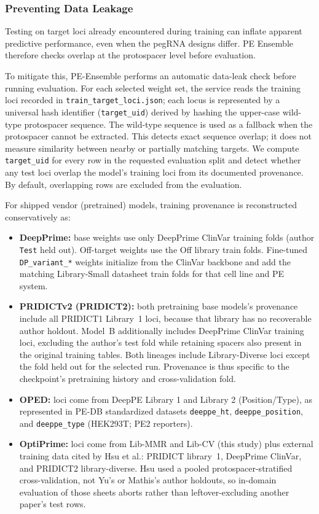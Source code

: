\documentclass{article}
\begin{document}
\subsubsection{Preventing Data Leakage}

Testing on target loci already encountered during training can inflate apparent predictive performance, even when the pegRNA designs differ. PE Ensemble therefore checks overlap at the protospacer level before evaluation.

To mitigate this, PE-Ensemble performs an automatic data-leak check before running evaluation. For each selected weight set, the service reads the training loci recorded in \nolinkurl{train_target_loci.json}; each locus is represented by a universal hash identifier (\texttt{target\_uid}) derived by hashing the upper-case wild-type protospacer sequence. The wild-type sequence is used as a fallback when the protospacer cannot be extracted. This detects exact sequence overlap; it does not measure similarity between nearby or partially matching targets. We compute \texttt{target\_uid} for every row in the requested evaluation split and detect whether any test loci overlap the model's training loci from its documented provenance. By default, overlapping rows are excluded from the evaluation.

For shipped vendor (pretrained) models, training provenance is reconstructed conservatively as:
\begin{itemize}
    \item \textbf{DeepPrime:} base weights use only DeepPrime ClinVar training folds (author \texttt{Test} held out). Off-target weights use the Off library train folds. Fine-tuned \texttt{DP\_variant\_*} weights initialize from the ClinVar backbone and add the matching Library-Small datasheet train folds for that cell line and PE system.
    \item \textbf{PRIDICTv2 (PRIDICT2):} both pretraining base models's provenance include all PRIDICT1 Library~1 loci, because that library has no recoverable author holdout. Model~B additionally includes DeepPrime ClinVar training loci, excluding the author's test fold while retaining spacers also present in the original training tables. Both lineages include Library-Diverse loci except the fold held out for the selected run. Provenance is thus specific to the checkpoint's pretraining history and cross-validation fold.
    \item \textbf{OPED:} loci come from DeepPE Library 1 and Library 2 (Position/Type), as represented in PE-DB standardized datasets \nolinkurl{deeppe\_ht}, \nolinkurl{deeppe\_position}, and \nolinkurl{deeppe\_type} (HEK293T; PE2 reporters).
    \item \textbf{OptiPrime:} loci come from Lib-MMR and Lib-CV (this study) plus external training data cited by Hsu et al.: PRIDICT library~1, DeepPrime ClinVar, and PRIDICT2 library-diverse. Hsu used a pooled protospacer-stratified cross-validation, not Yu's or Mathis's author holdouts, so in-domain evaluation of those sheets aborts rather than leftover-excluding another paper's test rows.
\end{itemize}
\end{document}
